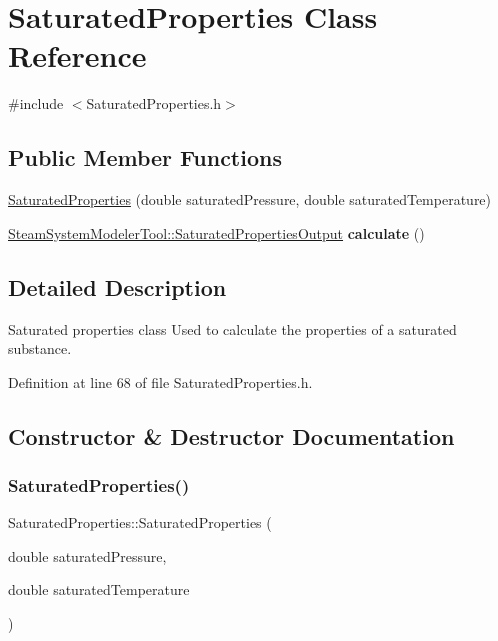 \hypertarget{class_saturated_properties}{}\section{Saturated\+Properties Class Reference}
\label{class_saturated_properties}


{\ttfamily \#include $<$Saturated\+Properties.\+h$>$}

\subsection*{Public Member Functions}
\begin{DoxyCompactItemize}
\item 
\hyperlink{class_saturated_properties_a83cc16d024ff9bd7ac586df9e946a062}{Saturated\+Properties} (double saturated\+Pressure, double saturated\+Temperature)
\item 
\mbox{\label{class_saturated_properties_ae24623020cfb1b0a339a4a22332e84eb}} 
\hyperlink{struct_steam_system_modeler_tool_1_1_saturated_properties_output}{Steam\+System\+Modeler\+Tool\+::\+Saturated\+Properties\+Output} {\bfseries calculate} ()
\end{DoxyCompactItemize}


\subsection{Detailed Description}
Saturated properties class Used to calculate the properties of a saturated substance. 

Definition at line 68 of file Saturated\+Properties.\+h.



\subsection{Constructor \& Destructor Documentation}
\mbox{\label{class_saturated_properties_a83cc16d024ff9bd7ac586df9e946a062}} 
\subsubsection{\texorpdfstring{Saturated\+Properties()}{SaturatedProperties()}}
{\footnotesize\ttfamily Saturated\+Properties\+::\+Saturated\+Properties (\begin{DoxyParamCaption}\item[{double}]{saturated\+Pressure,  }\item[{double}]{saturated\+Temperature }\end{DoxyParamCaption})\hspace{0.3cm}{\ttfamily [inline]}}

